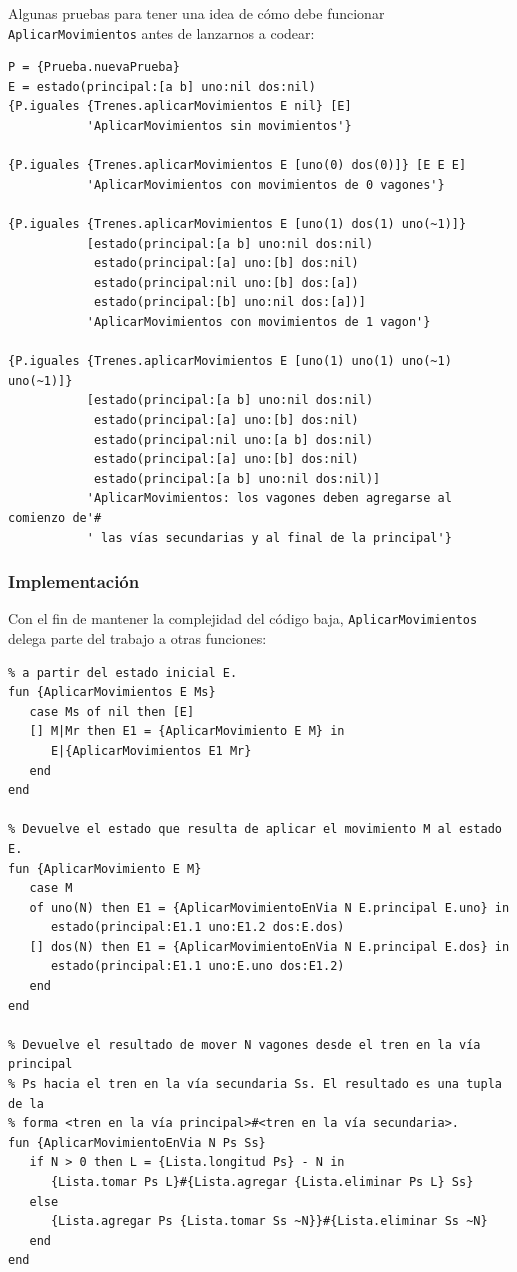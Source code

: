 \documentclass[12pt,titlepage]{article}
\begin{document}
Algunas pruebas para tener una idea de cómo debe funcionar \lstinline|AplicarMovimientos| antes de lanzarnos a codear:
\begin{lstlisting}[basicstyle=\ttfamily\footnotesize]
P = {Prueba.nuevaPrueba}
E = estado(principal:[a b] uno:nil dos:nil)
{P.iguales {Trenes.aplicarMovimientos E nil} [E] 
           'AplicarMovimientos sin movimientos'}

{P.iguales {Trenes.aplicarMovimientos E [uno(0) dos(0)]} [E E E] 
           'AplicarMovimientos con movimientos de 0 vagones'}

{P.iguales {Trenes.aplicarMovimientos E [uno(1) dos(1) uno(~1)]}
           [estado(principal:[a b] uno:nil dos:nil)
            estado(principal:[a] uno:[b] dos:nil)
            estado(principal:nil uno:[b] dos:[a])
            estado(principal:[b] uno:nil dos:[a])]
           'AplicarMovimientos con movimientos de 1 vagon'}

{P.iguales {Trenes.aplicarMovimientos E [uno(1) uno(1) uno(~1) uno(~1)]}
           [estado(principal:[a b] uno:nil dos:nil)
            estado(principal:[a] uno:[b] dos:nil)
            estado(principal:nil uno:[a b] dos:nil)
            estado(principal:[a] uno:[b] dos:nil)
            estado(principal:[a b] uno:nil dos:nil)]
           'AplicarMovimientos: los vagones deben agregarse al comienzo de'#
           ' las vías secundarias y al final de la principal'}
\end{lstlisting}

\subsubsection{Implementación}
Con el fin de mantener la complejidad del código baja, \lstinline|AplicarMovimientos| delega parte del trabajo a otras funciones:
\begin{lstlisting}[basicstyle=\ttfamily\footnotesize]
% Devuelve la lista de los estados que resulta de aplicar los movimientos Ms
% a partir del estado inicial E.
fun {AplicarMovimientos E Ms}
   case Ms of nil then [E]
   [] M|Mr then E1 = {AplicarMovimiento E M} in
      E|{AplicarMovimientos E1 Mr}
   end
end

% Devuelve el estado que resulta de aplicar el movimiento M al estado E.
fun {AplicarMovimiento E M}
   case M 
   of uno(N) then E1 = {AplicarMovimientoEnVia N E.principal E.uno} in
      estado(principal:E1.1 uno:E1.2 dos:E.dos)
   [] dos(N) then E1 = {AplicarMovimientoEnVia N E.principal E.dos} in
      estado(principal:E1.1 uno:E.uno dos:E1.2)
   end
end

% Devuelve el resultado de mover N vagones desde el tren en la vía principal 
% Ps hacia el tren en la vía secundaria Ss. El resultado es una tupla de la 
% forma <tren en la vía principal>#<tren en la vía secundaria>.
fun {AplicarMovimientoEnVia N Ps Ss}
   if N > 0 then L = {Lista.longitud Ps} - N in
      {Lista.tomar Ps L}#{Lista.agregar {Lista.eliminar Ps L} Ss}
   else
      {Lista.agregar Ps {Lista.tomar Ss ~N}}#{Lista.eliminar Ss ~N}
   end
end
\end{lstlisting}
\end{document}
